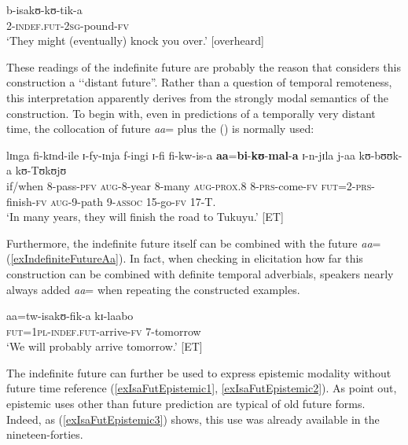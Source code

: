 \begin{exe}
\ex \label{exIsaFutBodaBoda} \gll b-isakʊ-kʊ-tik-a\\
2-\textsc{indef.fut}-\textsc{2sg}-pound-\textsc{fv}\\
\glt `They might (eventually) knock you over.' [overheard]
\end{exe}

These readings of the indefinite future are probably the reason that \citet{NurseD1979} considers this construction a \lq\lq distant future''. Rather than a question of temporal remoteness, this interpretation apparently derives from the strongly modal semantics of the construction. To begin with, even in predictions of a temporally very distant time, the collocation of future  \textit{aa}= plus the  () is normally used:

\begin{exe}
\ex \gll lɪnga fi-kɪnd-ile ɪ-fy-ɪnja f-ingi ɪ-fi fi-kw-is-a \textbf{aa}=\textbf{bi}-\textbf{kʊ}-\textbf{mal}-\textbf{a} ɪ-n-jɪla j-aa kʊ-bʊʊk-a kʊ-Tʊkʊjʊ\\
if/when 8-pass-\textsc{pfv} \textsc{aug}-8-year 8-many \textsc{aug}-\textsc{prox.8} 8-\textsc{prs}-come-\textsc{fv} \textsc{fut}=2-\textsc{prs}-finish-\textsc{fv} \textsc{aug}-9-path 9-\textsc{assoc} 15-go-\textsc{fv} 17-T.\\
\glt \lq In many years, they will finish the road to Tukuyu.' [ET]
\end{exe}

Furthermore, the indefinite future itself can be combined with the future  \textit{aa}= (\ref{exIndefiniteFutureAa}). In fact, when checking in elicitation how far this construction can be combined with definite temporal adverbials, speakers nearly always added \textit{aa}= when repeating the constructed examples.

\begin{exe}
\ex \label{exIndefiniteFutureAa} \gll aa=tw-isakʊ-fik-a kɪ-laabo\\
\textsc{fut}=\textsc{1pl}-\textsc{indef.fut}-arrive-\textsc{fv} 7-tomorrow\\
\glt \lq We will probably arrive tomorrow.' [ET]
\end{exe}

The indefinite future can further be used to express epistemic modality without future time reference (\ref{exIsaFutEpistemic1}, \ref{exIsaFutEpistemic2}). As \citet{BybeePagliucaPerkins1991} point out, epistemic uses other than future prediction are typical of old future forms. Indeed, as (\ref{exIsaFutEpistemic3}) shows, this use was already available in the nineteen-forties.

